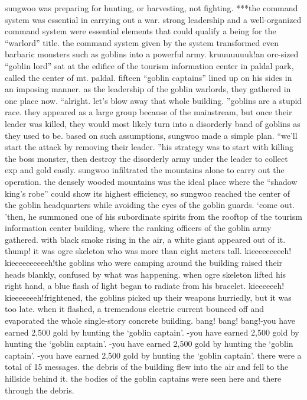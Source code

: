 sungwoo was preparing for hunting, or harvesting, not fighting.
***the command system was essential in carrying out a war.
 strong leadership and a well-organized command system were essential elements that could qualify a being for the “warlord” title.
the command system given by the system transformed even barbaric monsters such as goblins into a powerful army.
kruuuuuuuk!an orc-sized “goblin lord” sat at the edifice of the tourism information center in paldal park, called the center of mt.
 paldal.
 fifteen “goblin captains” lined up on his sides in an imposing manner.
 as the leadership of the goblin warlords, they gathered in one place now.
“alright.
 let’s blow away that whole building.
”goblins are a stupid race.
 they appeared as a large group because of the mainstream, but once their leader was killed, they would most likely turn into a disorderly band of goblins as they used to be.
based on such assumptions, sungwoo made a simple plan.
“we’ll start the attack by removing their leader.
”his strategy was to start with killing the boss monster, then destroy the disorderly army under the leader to collect exp and gold easily.
sungwoo infiltrated the mountains alone to carry out the operation.
 the densely wooded mountains was the ideal place where the “shadow king’s robe” could show its highest efficiency, so sungwoo reached the center of the goblin headquarters while avoiding the eyes of the goblin guards.
‘come out.
’then, he summoned one of his subordinate spirits from the rooftop of the tourism information center building, where the ranking officers of the goblin army gathered.
with black smoke rising in the air, a white giant appeared out of it.
thump!
it was ogre skeleton who was more than eight meters tall.
kieeeeeeeeeh! kieeeeeeeeeeh!the goblins who were camping around the building raised their heads blankly, confused by what was happening.
when ogre skeleton lifted his right hand, a blue flash of light began to radiate from his bracelet.
kieeeeeeh! kieeeeeeeh!frightened, the goblins picked up their weapons hurriedly, but it was too late.
 when it flashed, a tremendous electric current bounced off and evaporated the whole single-story concrete building.
bang! bang! bang!-you have earned 2,500 gold by hunting the ‘goblin captain’.
-you have earned 2,500 gold by hunting the ‘goblin captain’.
-you have earned 2,500 gold by hunting the ‘goblin captain’.
-you have earned 2,500 gold by hunting the ‘goblin captain’.
there were a total of 15 messages.
 the debris of the building flew into the air and fell to the hillside behind it.
 the bodies of the goblin captains were seen here and there through the debris.
